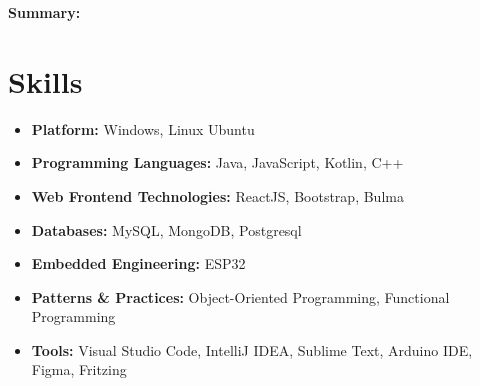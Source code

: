 \documentclass[11pt,a4paper,sans]{moderncv}        %
\begin{document}
\makecvtitle 
\textbf{Summary:}
\section{Skills}

\vspace{1pt}

\begin{itemize}

\item \textbf{Platform:} Windows, Linux Ubuntu

\vspace{1pt}

\item \textbf{Programming Languages:} Java, JavaScript, Kotlin, C++

\vspace{1pt}

\item \textbf{Web Frontend Technologies:} ReactJS, Bootstrap, Bulma

\vspace{1pt}

\item \textbf{Databases:} MySQL, MongoDB, Postgresql

\vspace{1pt}

\item \textbf{Embedded Engineering:} ESP32

\vspace{1pt}

\item \textbf{Patterns \& Practices:} Object-Oriented Programming, Functional Programming

\vspace{1pt}

\item \textbf{Tools:} Visual Studio Code, IntelliJ IDEA, Sublime Text, Arduino IDE, Figma, Fritzing

\vspace{1pt}

\end{itemize}
\end{document}
